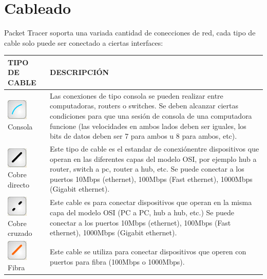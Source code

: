 \documentclass{article}
\begin{document}
    \section{Cableado}
    Packet Tracer soporta una variada cantidad de conecciones de red, cada tipo de cable solo puede ser conectado a ciertas interfaces:
    \begin{center}
        \begin{tabular}{| p{5cm} | p{11cm} |}
            \hline
            {\bfseries TIPO DE CABLE} & {\bfseries DESCRIPCIÓN} \\\hline
            \includegraphics[width=0.125\linewidth]{img_5} Consola & Las conexiones de tipo consola se pueden realizar entre computadoras, routers o switches. Se deben alcanzar ciertas condiciones para que una sesión de consola de una computadora funcione (las velocidades en ambos lados deben ser iguales, los bits de datos deben ser 7 para ambos u 8 para ambos, etc). \\\hline
            \includegraphics[width=0.125\linewidth]{img_6} Cobre directo & Este tipo de cable es el estandar de conexiónentre dispositivos que operan en las diferentes capas del modelo OSI, por ejemplo hub a router, switch a pc, router a hub, etc. Se puede conectar a los puertos 10Mbps (ethernet), 100Mbps (Fast ethernet), 1000Mbps (Gigabit ethernet).\\\hline
            \includegraphics[width=0.125\linewidth]{img_7} Cobre cruzado & Este cable es para conectar dispositivos que operan en la misma capa del modelo OSI (PC a PC, hub a hub, etc.) Se puede conectar a los puertos 10Mbps (ethernet), 100Mbps (Fast ethernet), 1000Mbps (Gigabit ethernet).\\\hline
            \includegraphics[width=0.125\linewidth]{img_8} Fibra & Este cable se utiliza para conectar dispositivos que operen con puertos para fibra (100Mbps o 1000Mbps).\\\hline
        \end{tabular}
    \end{center} 
\end{document}
